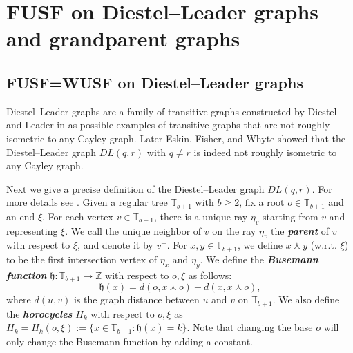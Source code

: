 \documentclass[12pt]{article}
\numberwithin{equation}{section}
\newcommand{\1}{\mathbf{1}}
\newcommand{\notion}[1]{{\bf  \textit{#1}}}
\begin{document}
 \section{FUSF on Diestel--Leader graphs and grandparent graphs}\label{sec: 5}
 
 
 \subsection{FUSF=WUSF on Diestel--Leader graphs}
 Diestel--Leader graphs are a family of transitive graphs constructed by Diestel and Leader in \cite{DL2001} as possible examples of transitive graphs that are not roughly isometric to any Cayley graph. Later Eskin, Fisher, and Whyte  \cite{EFW2012} showed that the Diestel--Leader graph $DL(q,r)$ with $q\neq r$ is indeed not roughly isometric to any Cayley graph. 
 
 Next we give a precise definition of the Diestel--Leader graph $DL(q,r)$. For more details see \cite{Woess2005}. 
	 Given a regular tree $\mathbb{T}_{b+1}$ with $b\geq2$, fix a root $o\in \mathbb{T}_{b+1}$ and an end $\xi$. For each vertex $v\in \mathbb{T}_{b+1}$, there is a unique ray $\eta_v$ starting from $v$ and representing $\xi$. We call the unique neighbor of $v$ on the ray $\eta_v$ the \notion{parent} of $v$ with respect to $\xi$, and denote it by $v^-$. For $x,y\in \mathbb{T}_{b+1}$, we define $x\curlywedge y$ (w.r.t. $\xi$) to be the first intersection vertex of $\eta_x$ and $\eta_y$.  We define the \notion{Busemann function} $\mathfrak{h}:\mathbb{T}_{b+1}\rightarrow\mathbb{Z}$ with respect to $o,\xi$ as follows:
\[
\mathfrak{h}(x)=d(o,x\curlywedge o)-d(x,x\curlywedge o), 
\]
where $d(u,v)$ is the graph distance between $u$ and $v$ on  $\mathbb{T}_{b+1}$. We also define the \notion{horocycles} $H_k$ with respect to $o,\xi$ as $H_k=H_k(o,\xi):=\{x\in \mathbb{T}_{b+1}: \mathfrak{h}(x)=k \}$.  Note that changing the base $o$ will only change the Busemann function by adding a constant.
\end{document}

